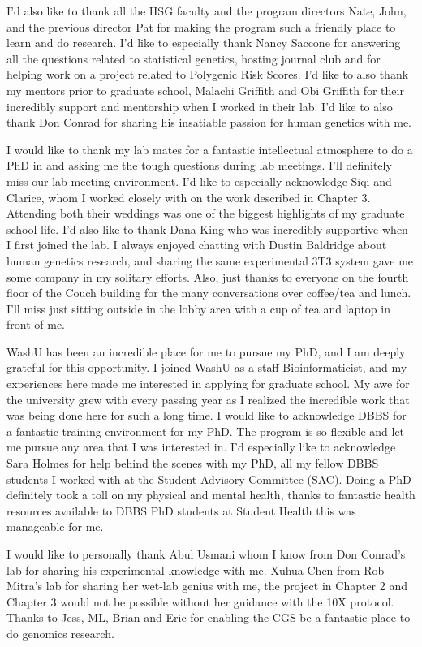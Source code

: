 I'd also like to thank all the HSG faculty and the program directors Nate, John, and the previous director Pat for making the program such a friendly place to learn and do research. I'd like to especially thank Nancy Saccone for answering all the questions related to statistical genetics, hosting journal club and for helping work on a project related to Polygenic Risk Scores. I'd like to also thank my mentors prior to graduate school, Malachi Griffith and Obi Griffith for their incredibly support and mentorship when I worked in their lab. I'd like to also thank Don Conrad for sharing his insatiable passion for human genetics with me.

I would like to thank my lab mates for a fantastic intellectual atmosphere to do a PhD in and asking me the tough questions during lab meetings. I'll definitely miss our lab meeting environment. I'd like to especially acknowledge Siqi and Clarice, whom I worked closely with on the work described in Chapter 3. Attending both their weddings was one of the biggest highlights of my graduate school life. I'd also like to thank Dana King who was incredibly supportive when I first joined the lab. I always enjoyed chatting with Dustin Baldridge about human genetics research, and sharing the same experimental 3T3 system gave me some company in my solitary efforts. Also, just thanks to everyone on the fourth floor of the Couch building for the many conversations over coffee/tea and lunch. I'll miss just sitting outside in the lobby area with a cup of tea and laptop in front of me.

WashU has been an incredible place for me to pursue my PhD, and I am deeply grateful for this opportunity. I joined WashU as a staff Bioinformaticist, and my experiences here made me interested in applying for graduate school. My awe for the university grew with every passing year as I realized the incredible work that was being done here for such a long time. I would like to acknowledge DBBS for a fantastic training environment for my PhD. The program is so flexible and let me pursue any area that I was interested in. I'd especially like to acknowledge Sara Holmes for help behind the scenes with my PhD, all my fellow DBBS students I worked with at the Student Advisory Committee (SAC). Doing a PhD definitely took a toll on my physical and mental health, thanks to fantastic health resources available to DBBS PhD students at Student Health this was manageable for me. 

I would like to personally thank Abul Usmani whom I know from Don Conrad's lab for sharing his experimental knowledge with me. Xuhua Chen from Rob Mitra's lab for sharing her wet-lab genius with me, the project in Chapter 2 and Chapter 3 would not be possible without her guidance with the 10X protocol. Thanks to Jess, ML, Brian and Eric for enabling the CGS be a fantastic place to do genomics research.

